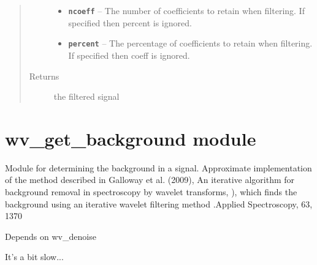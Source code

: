 \documentclass[letterpaper,10pt,english]{sphinxmanual}
\begin{document}
\begin{fulllineitems}
\begin{quote}
\begin{description}
\begin{itemize}
\item {} 
\textbf{\texttt{ncoeff}} -- The number of coefficients to retain when filtering.
If specified then percent is ignored.

\item {} 
\textbf{\texttt{percent}} -- The percentage of coefficients to retain when filtering.
If specified then coeff is ignored.

\end{itemize}

\item[{Returns}] \leavevmode
the filtered signal

\end{description}\end{quote}

\end{fulllineitems}



\section{wv\_get\_background module}
\label{wv_get_background:wv-get-background-module}\label{wv_get_background:module-wv_get_background}\label{wv_get_background::doc}
Module for determining the background in a signal.
Approximate implementation of the method described in Galloway et al. (2009),
An iterative algorithm for background removal in spectroscopy by wavelet transforms, ),
which finds the background using an iterative wavelet filtering method .Applied Spectroscopy, 63, 1370

Depends on wv\_denoise

It's a bit slow...
\end{document}

